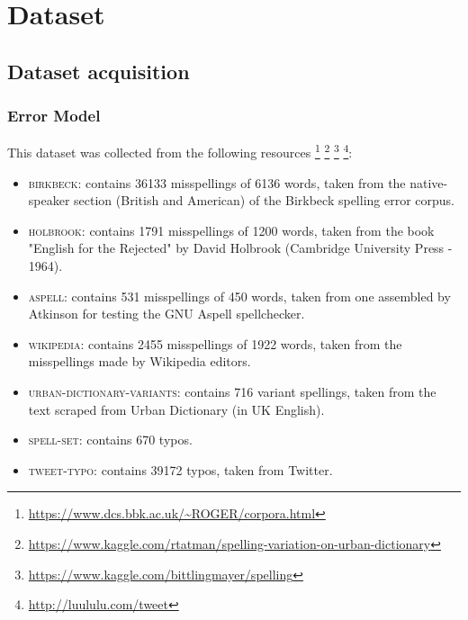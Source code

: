 \chapter{Dataset}



\section{Dataset acquisition}
\label{section:dataset-exploration}
\subsection{Error Model}
This dataset was collected from the following resources 
\footnote{\url{https://www.dcs.bbk.ac.uk/~ROGER/corpora.html}}  
\footnote{\url{https://www.kaggle.com/rtatman/spelling-variation-on-urban-dictionary}}  
\footnote{\url{https://www.kaggle.com/bittlingmayer/spelling}}
\footnote{\url{http://luululu.com/tweet}}:
\begin{itemize}
	\item \textsc{birkbeck}: contains \num{36133} misspellings of \num{6136} words, taken from the native-speaker 
	section (British and American) of the Birkbeck spelling error corpus.
	\item \textsc{holbrook}: contains \num{1791} misspellings of \num{1200} words, taken from the book "English for the 
	Rejected" by 
	David Holbrook (Cambridge University Press - 1964).
	\item \textsc{aspell}: contains \num{531} misspellings of \num{450} words, taken from one assembled by Atkinson for 
	testing the 
	GNU Aspell spellchecker.
	\item \textsc{wikipedia}: contains \num{2455} misspellings of \num{1922} words, taken from the misspellings made by 
	Wikipedia 
	editors.
	\item \textsc{urban-dictionary-variants}: contains \num{716} variant spellings, taken from the text scraped from Urban 
	Dictionary (in UK English).
	\item \textsc{spell-set}: contains \num{670} typos.
	\item \textsc{tweet-typo}: contains \num{39172} typos, taken from Twitter.
\end{itemize}


